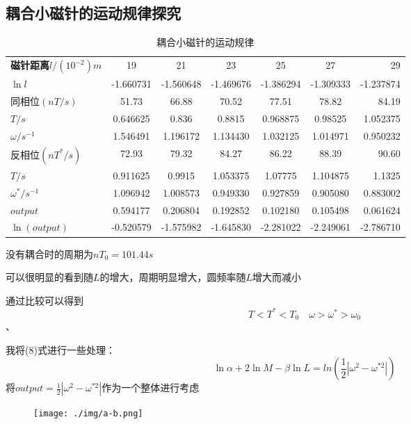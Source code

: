 \documentclass{article}
\begin{document}
\subsection{耦合小磁针的运动规律探究}
\begin{table}[!hbtp]
    \begin{center}
    \caption{耦合小磁针的运动规律}
    \begin{tabular}{l|c|c|c|c|c|r}
        \textbf{磁针距离$l/(10^{-2})m$} & 19 & 21 & 23 & 25 & 27 & 29 \\
        $\ln l$ & -1.660731 & -1.560648 & -1.469676 & -1.386294 & -1.309333 & -1.237874 \\
        \hline
        同相位$(nT/s)$ & 51.73 & 66.88 & 70.52 & 77.51 & 78.82 & 84.19 \\
        $T/s$ & 0.646625 & 0.836 & 0.8815 & 0.968875 & 0.98525 & 1.052375 \\
        $\omega/s^{-1}$ & 1.546491 & 1.196172 & 1.134430 & 1.032125 & 1.014971 & 0.950232 \\
        \hline
        反相位$(nT^*/s)$ & 72.93 & 79.32 & 84.27 & 86.22 & 88.39 & 90.60 \\
        $T/s$ & 0.911625 & 0.9915 & 1.053375 & 1.07775 & 1.104875 & 1.1325 \\
        $\omega^*/s^{-1}$ & 1.096942 & 1.008573 & 0.949330 & 0.927859 & 0.905080 & 0.883002 \\
        \hline
        $output$ & 0.594177 & 0.206804 & 0.192852 & 0.102180 & 0.105498 & 0.061624 \\
        $\ln(output)$ & -0.520579 & -1.575982 & -1.645830 & -2.281022 & -2.249061 & -2.786710 \\
    \end{tabular}
    \end{center}
\end{table}
没有耦合时的周期为$nT_0=101.44s$

可以很明显的看到随$L$的增大，周期明显增大，圆频率随$L$增大而减小

通过比较可以得到$$T<T^*<T_0\quad \omega >\omega ^*>\omega _0$$、

我将(8)式进行一些处理：
\begin{equation}
    \ln \alpha+2\ln M-\beta\ln L=ln(\frac{1}{2}\left|\omega^2-\omega^{*2}\right|)
\end{equation}
将$output=\frac{1}{2}\left|\omega^2-\omega^{*2}\right|$作为一个整体进行考虑

\begin{figure}[H]
    \centering
    \texttt{[image: ./img/a-b.png]}
\end{figure}
\end{document}
